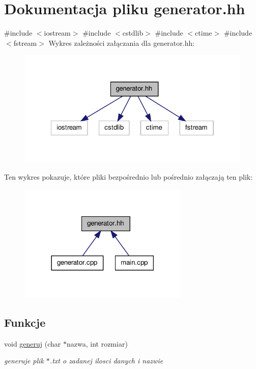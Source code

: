 \hypertarget{generator_8hh}{\section{\-Dokumentacja pliku generator.\-hh}
\label{generator_8hh}
}
{\ttfamily \#include $<$iostream$>$}\*
{\ttfamily \#include $<$cstdlib$>$}\*
{\ttfamily \#include $<$ctime$>$}\*
{\ttfamily \#include $<$fstream$>$}\*
\-Wykres zależności załączania dla generator.\-hh\-:\nopagebreak
\begin{figure}[H]
\begin{center}
\leavevmode
\includegraphics[width=322pt]{generator_8hh__incl}
\end{center}
\end{figure}
\-Ten wykres pokazuje, które pliki bezpośrednio lub pośrednio załączają ten plik\-:\nopagebreak
\begin{figure}[H]
\begin{center}
\leavevmode
\includegraphics[width=230pt]{generator_8hh__dep__incl}
\end{center}
\end{figure}
\subsection*{\-Funkcje}
\begin{DoxyCompactItemize}
\item 
void \hyperlink{generator_8hh_a8a338f908bb9996d5b01aab4439e8a56}{generuj} (char $\ast$nazwa, int rozmiar)
\begin{DoxyCompactList}\small\item\em generuje plik $\ast$.txt o zadanej ilosci danych i nazwie \end{DoxyCompactList}\end{DoxyCompactItemize}


